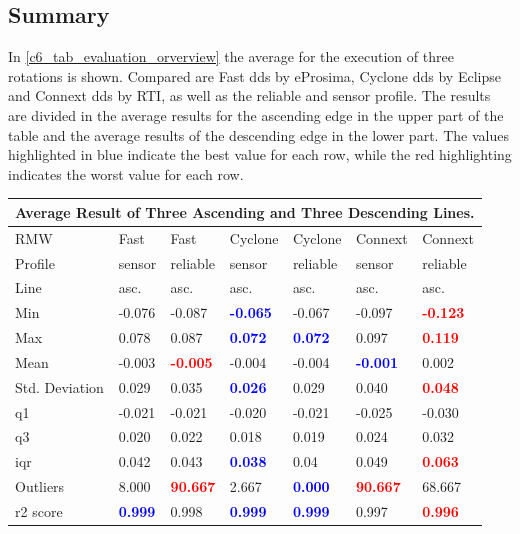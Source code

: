 \subsection{Summary}
In \autoref{c6_tab_evaluation_orverview} the average for the execution of three rotations is shown. Compared are Fast \gls{dds} by eProsima, Cyclone \gls{dds} by Eclipse and Connext \gls{dds} by RTI, as well as the reliable and sensor profile. The results are divided in the average results for the ascending edge in the upper part of the table and the average results of the descending edge in the lower part. The values highlighted in blue indicate the best value for each row, while the red highlighting indicates the worst value for each row.
\begin{table}[htbp]
\begin{tabular}{|l|ll|ll|ll|}
\toprule
\multicolumn{7}{|c|}{Average Result of Three Ascending and Three Descending Lines.} \\
\toprule
 RMW & Fast & Fast  & Cyclone & Cyclone & Connext & Connext \\
\midrule
Profile & sensor & reliable & sensor & reliable & sensor & reliable \\
\midrule
Line & asc. & asc. & asc. & asc. & asc. & asc. \\
Min & -0.076 & -0.087 & \textcolor{blue}{\textbf{-0.065}} & -0.067 & -0.097 & \textcolor{red}{\textbf{-0.123}} \\
Max & 0.078 & 0.087 & \textcolor{blue}{\textbf{0.072}} & \textcolor{blue}{\textbf{0.072}} & 0.097 & \textcolor{red}{\textbf{0.119}} \\
Mean & -0.003 & \textcolor{red}{\textbf{-0.005}} & -0.004 & -0.004 & \textcolor{blue}{\textbf{-0.001}} & 0.002 \\
Std. Deviation & 0.029 & 0.035 & \textcolor{blue}{\textbf{0.026}} & 0.029 & 0.040 & \textcolor{red}{\textbf{0.048}} \\
\gls{q1} & -0.021 & -0.021 & -0.020 & -0.021 & -0.025 & -0.030 \\
\gls{q3} & 0.020 & 0.022 & 0.018 & 0.019 & 0.024 & 0.032 \\
\gls{iqr} & 0.042 & 0.043 & \textcolor{blue}{\textbf{0.038}} & 0.04 & 0.049 & \textcolor{red}{\textbf{0.063}} \\
Outliers & 8.000 & \textcolor{red}{\textbf{90.667}} & 2.667 & \textcolor{blue}{\textbf{0.000}} & \textcolor{red}{\textbf{90.667}} & 68.667 \\
\gls{r2} score & \textcolor{blue}{\textbf{0.999}} & 0.998 & \textcolor{blue}{\textbf{0.999}} & \textcolor{blue}{\textbf{0.999}} & 0.997 & \textcolor{red}{\textbf{0.996}} \\

\end{tabular}
\end{table}
